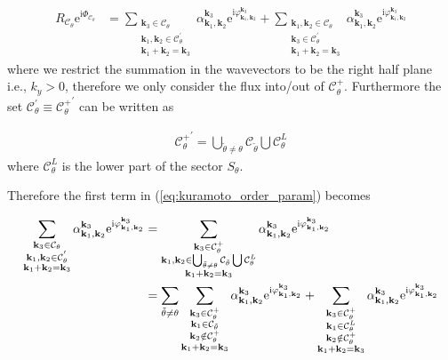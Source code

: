 \documentclass[9pt]{article}
\newcommand{\triad}[3]{\varphi_{#1, #2}^{#3}}                     %
\newcommand{\ii}{\mathrm{i}}      								  %
\newcommand{\e}{\mathrm{e}}      								  %
\newcommand{\alphakkk}[3]{\alpha_{\bfkn{#1}, \bfkn{#2}}^{\bfkn{#3}}}
\newcommand{\bfkn}[1]{\mathbf{k}_{#1}}								%
\begin{document}
\begin{align}
R_{\mathcal{C}_\theta}\e^{\ii\Phi_{\mathcal{C}_{\theta}}} &= \sum_{\substack{\bfkn{3} \in \mathcal{C}_{\theta} \\ \bfkn{1},  \bfkn{2} \in \mathcal{C}_{\theta}^{'} \\ \bfkn{1} + \bfkn{2} = \bfkn{3}}} \alphakkk{{1}}{2}{3}\e^{\ii \triad{\bfkn{1}}{\bfkn{2}}{\bfkn{3}}} + \sum_{\substack{\bfkn{1}, \bfkn{2} \in \mathcal{C}_{\theta} \\ \bfkn{3} \in \mathcal{C}_{\theta}^{'} \\ \bfkn{1} + \bfkn{2} = \bfkn{3}}} \alphakkk{{1}}{2}{3}\e^{\ii \triad{\bfkn{1}}{\bfkn{2}}{\bfkn{3}}} 
\label{eq:kuramoto_order_param}
\end{align}
where we restrict the summation in the wavevectors to be the right half plane i.e., $k_y > 0$, therefore we only consider the flux into/out of $\mathcal{C}_{\theta}^{+}$. Furthermore the set $\mathcal{C}_{\theta}^{'} \equiv {\mathcal{C}_{\theta}^{+}}^{'}$ can be written as

\begin{align}
	{\mathcal{C}_{\theta}^{+}}^{'} = \bigcup_{\tilde{\theta} \neq \theta} \mathcal{C}_{\tilde{\theta}} \bigcup \mathcal{C}_{\theta}^{L}
\end{align}
where $\mathcal{C}_{\theta}^{L}$ is the lower part of the sector $S_{\theta}$.

Therefore the first term in (\ref{eq:kuramoto_order_param}) becomes

\begin{align}
	\sum_{\substack{\bfkn{3} \in \mathcal{C}_{\theta} \\ \bfkn{1},  \bfkn{2} \in \mathcal{C}_{\theta}^{'} \\ \bfkn{1} + \bfkn{2} = \bfkn{3}}} \alphakkk{{1}}{2}{3}\e^{\ii \triad{\bfkn{1}}{\bfkn{2}}{\bfkn{3}}} &= \sum_{\substack{\bfkn{3} \in \mathcal{C}_{\theta}^{+} \\ \bfkn{1},  \bfkn{2} \in \bigcup_{\tilde{\theta} \neq \theta} \mathcal{C}_{\tilde{\theta}} \bigcup \mathcal{C}_{\theta}^{L} \\ \bfkn{1} + \bfkn{2} = \bfkn{3}}} \alphakkk{{1}}{2}{3}\e^{\ii \triad{\bfkn{1}}{\bfkn{2}}{\bfkn{3}}} \notag \\
	&= \sum_{\tilde{\theta} \neq \theta} \sum_{\substack{\bfkn{3} \in \mathcal{C}_{\theta}^{+} \\ \bfkn{1} \in \mathcal{C}_{\tilde{\theta}} \\ \bfkn{2} \notin \mathcal{C}_{\theta}^{+} \\ \bfkn{1} + \bfkn{2} = \bfkn{3}}} \alphakkk{{1}}{2}{3}\e^{\ii \triad{\bfkn{1}}{\bfkn{2}}{\bfkn{3}}} + \sum_{\substack{\bfkn{3} \in \mathcal{C}_{\theta}^{+} \\ \bfkn{1} \in \mathcal{C}_{\theta}^{L} \\ \bfkn{2} \notin \mathcal{C}_{\theta}^{+} \\ \bfkn{1} + \bfkn{2} = \bfkn{3}}} \alphakkk{{1}}{2}{3}\e^{\ii \triad{\bfkn{1}}{\bfkn{2}}{\bfkn{3}}}
\end{align}
\end{document}
